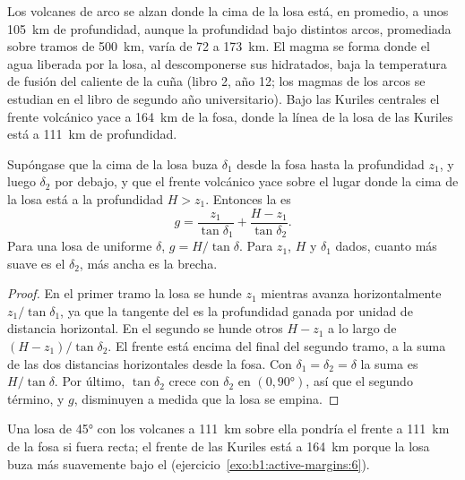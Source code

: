Los volcanes de arco se alzan donde la cima de la losa está, en promedio, a unos \qty{105}{km} de profundidad, aunque la profundidad bajo
distintos arcos, promediada sobre tramos de \qty{500}{km}, varía de 72 a \qty{173}{km}. El magma se forma donde el agua liberada por la losa,
al descomponerse sus  hidratados, baja la temperatura de fusión del  caliente de la cuña (libro 2, año 12; los magmas de los
arcos se estudian en el libro de segundo año universitario). Bajo las Kuriles centrales el frente volcánico yace a \qty{164}{km} de la fosa,
donde la línea de la losa de las Kuriles está a \qty{111}{km} de profundidad.

\begin{proposition}\label{prop:b1:active-margins:gap}
Supóngase que la cima de la losa buza $\delta_1$ desde la fosa hasta la profundidad $z_1$, y luego $\delta_2$ por debajo, y que el frente
volcánico yace sobre el lugar donde la cima de la losa está a la profundidad $H > z_1$. Entonces la  es
\[
  g = \frac{z_1}{\tan\delta_1} + \frac{H - z_1}{\tan\delta_2} .
\]
Para una losa de  uniforme $\delta$, $g = H/\tan\delta$. Para $z_1$, $H$ y $\delta_1$ dados, cuanto más suave es el 
$\delta_2$, más ancha es la brecha.
\end{proposition}

\begin{proof}
En el primer tramo la losa se hunde $z_1$ mientras avanza horizontalmente $z_1/\tan\delta_1$, ya que la tangente del  es la
profundidad ganada por unidad de distancia horizontal. En el segundo se hunde otros $H - z_1$ a lo largo de $(H - z_1)/\tan\delta_2$. El frente
está encima del final del segundo tramo, a la suma de las dos distancias horizontales desde la fosa. Con $\delta_1 = \delta_2
= \delta$ la suma
es $H/\tan\delta$. Por último, $\tan\delta_2$ crece con $\delta_2$ en $(0, \ang{90})$, así que el segundo término, y $g$, disminuyen a medida que
la losa se empina.
\end{proof}

Una losa de \ang{45} con los volcanes a \qty{111}{km} sobre ella pondría el frente a \qty{111}{km} de la fosa si fuera recta; el frente de las
Kuriles está a \qty{164}{km} porque la losa buza más suavemente bajo el  (ejercicio~\ref{exo:b1:active-margins:6}).

